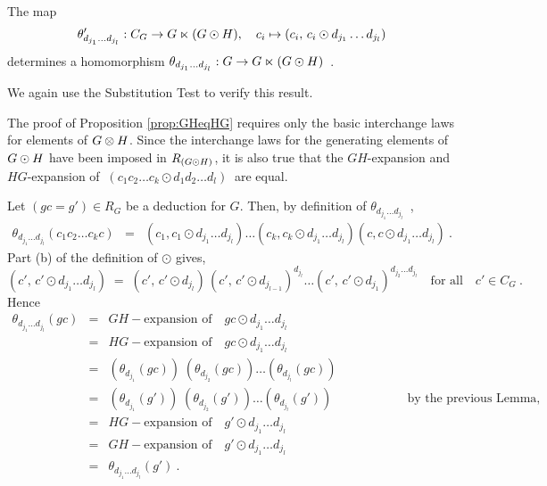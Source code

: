 \begin{lem} \label{lem:odot-elts}
The map
$$
\theta'_{d_{j_1} \ldots d_{j_{l}}} : C_G \to G \ltimes (G \odot H), \quad
c_i \mapsto (c_i,\,c_i \odot d_{j_1} \ldots d_{j_{l}})
$$
determines a homomorphism  
$\theta_{d_{j_1} \ldots d_{j_{l}}} : G \to G \ltimes (G \odot H)$~.
\end{lem}
\begin{pf}
We again use the Substitution Test to verify this result.

The proof of Proposition \ref{prop:GHeqHG} requires only 
the basic interchange laws for elements of  $G \otimes H$. 
Since the interchange laws for the generating elements of  $G \odot H$
have been imposed in  $R_{(G \odot H)}$, it is also true that
the $GH$-expansion and $HG$-expansion of
$~(c_1 c_2 \ldots c_k \odot d_1 d_2 \ldots d_{l})~$
are equal.

Let  $(gc = g') \in R_G$  be a deduction for  $G$.  
Then,
by definition of  $\theta_{d_{j_1} \ldots d_{j_{l}}}$~,
\begin{eqnarray*}
\theta_{d_{j_1} \ldots d_{j_{l}}}(c_1c_2\ldots c_kc)
  & = &  (c_1,c_1 \odot d_{j_1} \ldots d_{j_{l}}) \ldots
         (c_k,c_k \odot d_{j_1} \ldots d_{j_{l}})
         (c,c \odot d_{j_1} \ldots d_{j_{l}})~.
\end{eqnarray*}
Part (b) of the definition of  $\odot$ gives,
$$
(c',\,c' \odot d_{j_1} \ldots d_{j_{l}}) \;=\; 
(c',\,c' \odot d_{j_{l}})\,(c',\,c' \odot d_{j_{l-1}})^{d_{j_{l}}}
\ldots (c',\,c' \odot d_{j_1})^{d_{j_2}\ldots d_{j_{l}}}
\quad \mbox{for all} \quad  c' \in C_G~.
$$
Hence
\begin{eqnarray*}
\theta_{d_{j_1} \ldots d_{j_{l}}}(gc) 
  & = &  GH-\mbox{expansion of}\quad gc \odot d_{j_1} \ldots d_{j_{l}} \\
  & = &  HG-\mbox{expansion of}\quad gc \odot d_{j_1} \ldots d_{j_{l}} \\
  & = &  (\theta_{d_{j_1}}(gc) )\;(\theta_{d_{j_2}}(gc) )
         \ldots (\theta_{d_{j_{l}}}(gc) )    \\
  & = &  (\theta_{d_{j_1}}(g') )\;(\theta_{d_{j_2}}(g') )
         \ldots (\theta_{d_{j_{l}}}(g') ) 
        \qquad\qquad\qquad \mbox{by the previous Lemma,}   \\
  & = &  HG-\mbox{expansion of}\quad g' \odot d_{j_1} \ldots d_{j_{l}} \\
  & = &  GH-\mbox{expansion of}\quad g' \odot d_{j_1} \ldots d_{j_{l}} \\
  & = &  \theta_{d_{j_1} \ldots d_{j_{l}}}(g') ~.
\end{eqnarray*}
\end{pf}

